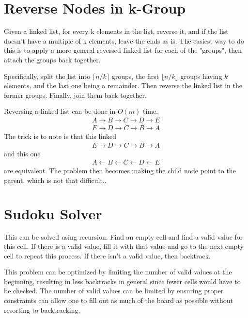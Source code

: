 \documentclass{article}
\newcommand{\floor}[1]{\lfloor #1 \rfloor}
\newcommand{\ceil}[1]{\lceil #1 \rceil}
\begin{document}
\section*{Reverse Nodes in k-Group}

Given a linked list, for every k elements in the list, reverse it, and if the list doesn't have a multiple of k elements, leave the ends as is. The easiest way to do this is to apply a more general reversed linked list for each of the "groups", then attach the groups back together.

Specifically, split the list into \( \ceil{n / k} \) groups, the first \( \floor{n / k} \) groups having \( k \) elements, and the last one being a remainder. Then reverse the linked list in the former groups. Finally, join them back together.

Reversing a linked list can be done in \( O(m) \) time.
\begin{gather*}
A \rightarrow B \rightarrow C \rightarrow D \rightarrow E \\
E \rightarrow D \rightarrow C \rightarrow B \rightarrow A
\end{gather*}
The trick is to note is that this linked
\begin{gather*}
E \rightarrow D \rightarrow C \rightarrow B \rightarrow A
\end{gather*}
and this one
\begin{gather*}
A \leftarrow B \leftarrow C \leftarrow D \leftarrow E
\end{gather*}
are equivalent. The problem then becomes making the child node point to the parent, which is not that difficult..


\section*{Sudoku Solver}

This can be solved using recursion. Find an empty cell and find a valid value for this cell. If there is a valid value, fill it with that value and go to the next empty cell to repeat this process. If there isn't a valid value, then backtrack.

This problem can be optimized by limiting the number of valid values at the beginning, resulting in less backtracks in general since fewer cells would have to be checked. The number of valid values can be limited by ensuring proper constraints can allow one to fill out as much of the board as possible without resorting to backtracking.
\end{document}
